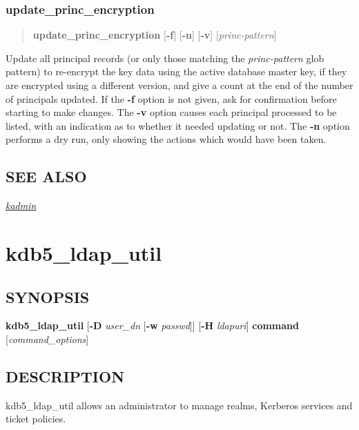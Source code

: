 \documentclass[letterpaper,10pt,english]{sphinxmanual}
\begin{document}
\subsubsection{update\_princ\_encryption}
\label{admin/admin_commands/kdb5_util:update-princ-encryption}\begin{quote}

\textbf{update\_princ\_encryption} {[}\textbf{-f}{]} {[}\textbf{-n}{]} {[}\textbf{-v}{]}
{[}\emph{princ-pattern}{]}
\end{quote}

Update all principal records (or only those matching the
\emph{princ-pattern} glob pattern) to re-encrypt the key data using the
active database master key, if they are encrypted using a different
version, and give a count at the end of the number of principals
updated.  If the \textbf{-f} option is not given, ask for confirmation
before starting to make changes.  The \textbf{-v} option causes each
principal processed to be listed, with an indication as to whether it
needed updating or not.  The \textbf{-n} option performs a dry run, only
showing the actions which would have been taken.


\subsection{SEE ALSO}
\label{admin/admin_commands/kdb5_util:see-also}
{\hyperref[admin/admin_commands/kadmin_local:kadmin-1]{\emph{kadmin}}}


\section{kdb5\_ldap\_util}
\label{admin/admin_commands/kdb5_ldap_util:kdb5-ldap-util-8}\label{admin/admin_commands/kdb5_ldap_util::doc}\label{admin/admin_commands/kdb5_ldap_util:kdb5-ldap-util}

\subsection{SYNOPSIS}
\label{admin/admin_commands/kdb5_ldap_util:synopsis}\label{admin/admin_commands/kdb5_ldap_util:kdb5-ldap-util-synopsis}
\textbf{kdb5\_ldap\_util}
{[}\textbf{-D} \emph{user\_dn} {[}\textbf{-w} \emph{passwd}{]}{]}
{[}\textbf{-H} \emph{ldapuri}{]}
\textbf{command}
{[}\emph{command\_options}{]}


\subsection{DESCRIPTION}
\label{admin/admin_commands/kdb5_ldap_util:kdb5-ldap-util-synopsis-end}\label{admin/admin_commands/kdb5_ldap_util:description}
kdb5\_ldap\_util allows an administrator to manage realms, Kerberos
services and ticket policies.
\end{document}
